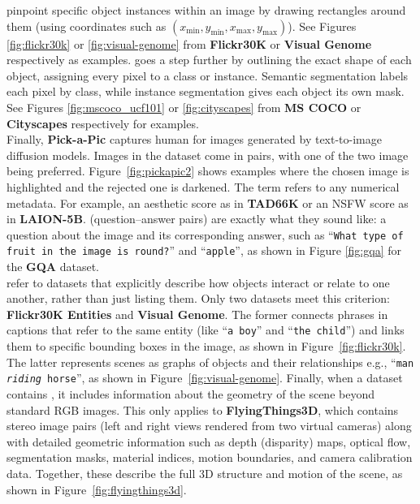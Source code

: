 \documentclass{article}
\begin{document}
 pinpoint specific object instances within an image by drawing rectangles around them (using coordinates such as $(x_{\min},y_{\min},x_{\max},y_{\max})$). See Figures \ref{fig:flickr30k} or \ref{fig:visual-genome} from \textbf{Flickr30K} or \textbf{Visual Genome} respectively as examples.  goes a step further by outlining the exact shape of each object, assigning every pixel to a class or instance. Semantic segmentation labels each pixel by class, while instance segmentation gives each object its own mask. See Figures \ref{fig:mscoco_ucf101} or \ref{fig:cityscapes} from \textbf{MS COCO} or \textbf{Cityscapes} respectively for examples.\\

Finally, \textbf{Pick-a-Pic} captures human  for images generated by text-to-image diffusion models. Images in the dataset come in pairs, with one of the two image being preferred. Figure~\ref{fig:pickapic2} shows examples where the chosen image is highlighted and the rejected one is darkened. The term  refers to any numerical metadata. For example, an aesthetic score as in \textbf{TAD66K} or an NSFW score as in \textbf{LAION-5B}.  (question–answer pairs) are exactly what they sound like: a question about the image and its corresponding answer, such as “\texttt{What type of fruit in the image is round?}” and “\texttt{apple}”, as shown in Figure \ref{fig:gqa} for the \textbf{GQA} dataset.\\


  refer to datasets that explicitly describe how objects interact or relate to one another, rather than just listing them. Only two datasets meet this criterion: \textbf{Flickr30K Entities} and \textbf{Visual Genome}. The former connects phrases in captions that refer to the same entity (like “\texttt{a boy}” and “\texttt{the child}”) and links them to specific bounding boxes in the image, as shown in Figure~\ref{fig:flickr30k}. The latter represents scenes as graphs of objects and their relationships e.g., “\texttt{man \textit{riding} horse}”, as shown in Figure~\ref{fig:visual-genome}. Finally, when a dataset contains , it includes information about the geometry of the scene beyond standard RGB images. This only applies to \textbf{FlyingThings3D}, which contains stereo image pairs (left and right views rendered from two virtual cameras) along with detailed geometric information such as depth (disparity) maps, optical flow, segmentation masks, material indices, motion boundaries, and camera calibration data. Together, these describe the full 3D structure and motion of the scene, as shown in Figure~\ref{fig:flyingthings3d}.\\
\end{document}
